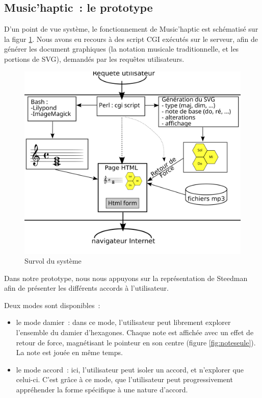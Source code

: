 \documentclass[
]{book}
\providecommand{\tightlist}{%
  \setlength{\itemsep}{0pt}\setlength{\parskip}{0pt}}
\begin{document}
\hypertarget{musichaptic-le-prototype}{%
\subsection{Music'haptic~: le prototype}\label{musichaptic-le-prototype}}

D'un point de vue système, le fonctionnement de Music'haptic est
schématisé sur la figur \ref{fig:survol}.
Nous avons eu recours à des script CGI exécutés sur le serveur, afin de
générer les document graphiques (la notation musicale traditionnelle, et les
portions de SVG), demandés par les requêtes utilisateurs.

\begin{figure}
\centering
\includegraphics{img/organisation.svg}
\caption{\label{fig:survol}Survol du système}
\end{figure}

Dans notre prototype, nous nous appuyons sur la représentation de Steedman
afin de présenter les différents accords à l'utilisateur.

Deux modes sont disponibles~:

\begin{itemize}
\tightlist
\item
  le mode damier~: dans ce mode, l'utilisateur
  peut librement explorer l'ensemble du damier d'hexagones. Chaque note est
  affichée avec un effet de retour de force, magnétisant le pointeur en son
  centre (figure \ref{fig:noteseule}). La note est jouée
  en même temps.
\item
  le mode accord~: ici, l'utilisateur peut isoler
  un accord, et n'explorer que celui-ci. C'est grâce à ce mode, que
  l'utilisateur peut progressivement appréhender la forme spécifique à une
  nature d'accord.
\end{itemize}
\end{document}

